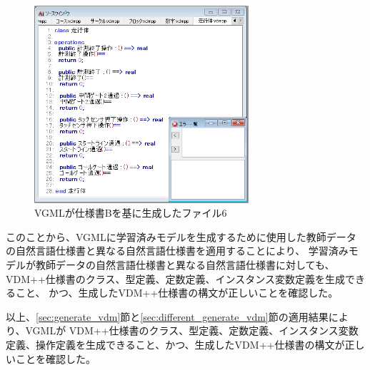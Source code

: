 \begin{figure}[tp]
    \begin{center}
    \includegraphics[width=300]{image/indicationB_vdm6.PNG}
    \caption{VGMLが仕様書Bを基に生成したファイル6}
    \label{fig:indicationB_vdm6}
    \end{center}
\end{figure}

このことから、VGMLに学習済みモデルを生成するために使用した教師データの自然言語仕様書と異なる自然言語仕様書を適用することにより、
学習済みモデルが教師データの自然言語仕様書と異なる自然言語仕様書に対しても、
VDM++仕様書のクラス、型定義、定数定義、インスタンス変数定義を生成できること、
かつ、生成したVDM++仕様書の構文が正しいことを確認した。

以上、\ref{sec:generate_vdm}節と\ref{sec:different_generate_vdm}節の適用結果により、VGMLが
VDM++仕様書のクラス、型定義、定数定義、インスタンス変数定義、操作定義を生成できること、かつ、生成したVDM++仕様書の構文が正しいことを確認した。